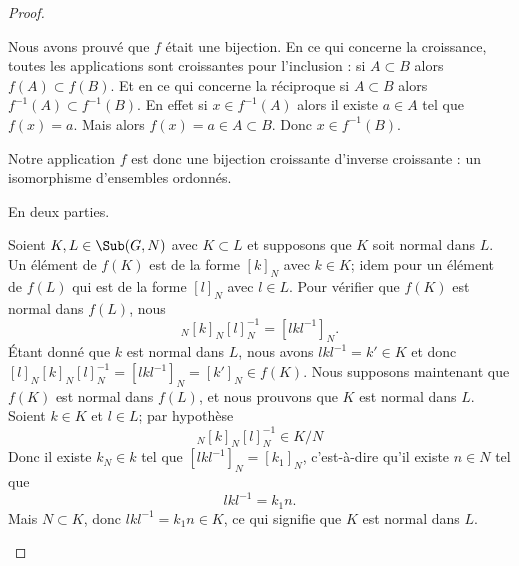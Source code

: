 \begin{proof}
\begin{subproof}
\begin{subproof}
			Nous avons prouvé que \( f\) était une bijection. En ce qui concerne la croissance, toutes les applications sont croissantes pour l'inclusion : si \( A\subset B\) alors \( f(A)\subset f(B)\). Et en ce qui concerne la réciproque si \( A\subset B\) alors \( f^{-1}(A)\subset f^{-1}(B)\). En effet si \( x\in f^{-1}(A)\) alors il existe \( a\in A\) tel que \( f(x)=a\). Mais alors \( f(x)=a\in A\subset B\). Donc \( x\in f^{-1}(B)\).

			Notre application \( f\) est donc une bijection croissante d'inverse croissante : un isomorphisme d'ensembles ordonnés.
		\end{subproof}
		En deux parties.
		\begin{subproof}
			\spitem[\( \Rightarrow\)]
			Soient \( K,L\in\Sub(G,N)\) avec \( K\subset L\) et supposons que \( K\) soit normal dans \( L\). Un élément de \( f(K)\) est de la forme \( [k]_N\) avec \( k\in K\); idem pour un élément de \( f(L)\) qui est de la forme \( [l]_N\) avec \( l\in L\). Pour vérifier que \( f(K)\) est normal dans \( f(L)\), nous
			\begin{equation}
				[l]_N[k]_N[l]_N^{-1}=[lkl^{-1}]_N.
			\end{equation}
			Étant donné que \( k\) est normal dans \( L\), nous avons \( lkl^{-1}=k'\in K\) et donc \( [l]_N[k]_N[l]_N^{-1}=[lkl^{-1}]_N=[k']_N\in f(K) \).
			\spitem[\( \Leftarrow\)]
			Nous supposons maintenant que \( f(K)\) est normal dans \( f(L)\), et nous prouvons que \( K\) est normal dans \( L\). Soient \( k\in K\) et \( l\in L\); par hypothèse
			\begin{equation}
				[l]_N[k]_N[l]_N^{-1}\in K/N
			\end{equation}
			Donc il existe \( k_N\in k\) tel que \( [lkl^{-1}]_N=[k_1]_N\), c'est-à-dire qu'il existe \( n\in N\) tel que
			\begin{equation}
				lkl^{-1}=k_1n.
			\end{equation}
			Mais \( N\subset K\), donc \( lkl^{-1}=k_1n\in K\), ce qui signifie que \( K\) est normal dans \( L\).
		\end{subproof}
	\end{subproof}
\end{proof}

